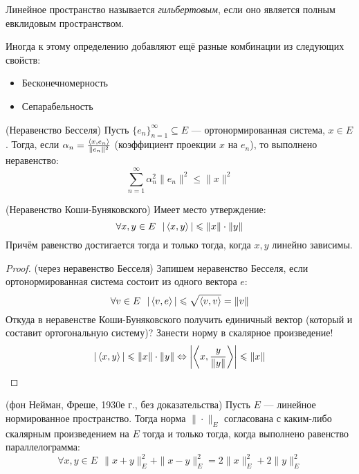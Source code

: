 \begin{definition}
	Линейное пространство называется \textit{гильбертовым}, если оно является полным евклидовым пространством.
\end{definition}

\begin{note}
	Иногда к этому определению добавляют ещё разные комбинации из следующих свойств:
	\begin{itemize}
		\item Бесконечномерность
		
		\item Сепарабельность
	\end{itemize}
\end{note}

\begin{reminder} (Неравенство Бесселя)
	Пусть $\{e_n\}_{n = 1}^\infty \subseteq E$ --- ортонормированная система, $x \in E$. Тогда, если $\alpha_n = \frac{\left\langle x, e_n\right\rangle}{\|e_n\|^2}$ (коэффициент проекции $x$ на $e_n$), то выполнено неравенство:
	\[
		\sum_{n = 1}^\infty \alpha_n^2\|e_n\|^2 \le \|x\|^2
	\]
\end{reminder}

\begin{proposition} (Неравенство Коши-Буняковского)
	Имеет место утверждение:
	\[
		\forall x, y \in E\ \ |\left\langle x, y\right\rangle| \leqslant \|x\| \cdot \|y\|
	\]
	Причём равенство достигается тогда и только тогда, когда $x, y$ линейно зависимы.
\end{proposition}

\begin{proof} (через неравенство Бесселя)
	Запишем неравенство Бесселя, если ортонормированная система состоит из одного вектора $e$:
	\[
		\forall v \in E\ \ |\left\langle v, e\right\rangle| \leqslant \sqrt{\left\langle v, v\right\rangle} = \|v\|
	\]
	Откуда в неравенстве Коши-Буняковского получить единичный вектор (который и составит ортогональную систему)? Занести норму в скалярное произведение!
	\[
		|\left\langle x, y\right\rangle| \leqslant \|x\| \cdot \|y\| \Leftrightarrow \left|\left\langle x, \frac{y}{\|y\|}\right\rangle\right| \leqslant \|x\|
	\]
\end{proof}

\begin{theorem} (фон Нейман, Фреше, 1930е г., без доказательства)
	Пусть $E$ --- линейное нормированное пространство. Тогда норма $\|\cdot\|_E$ согласована с каким-либо скалярным произведением на $E$ тогда и только тогда, когда выполнено равенство параллелограмма:
	\[
		\forall x, y \in E\ \ \|x + y\|_E^2 + \|x - y\|_E^2 = 2\|x\|_E^2 + 2\|y\|_E^2
	\]
\end{theorem}

